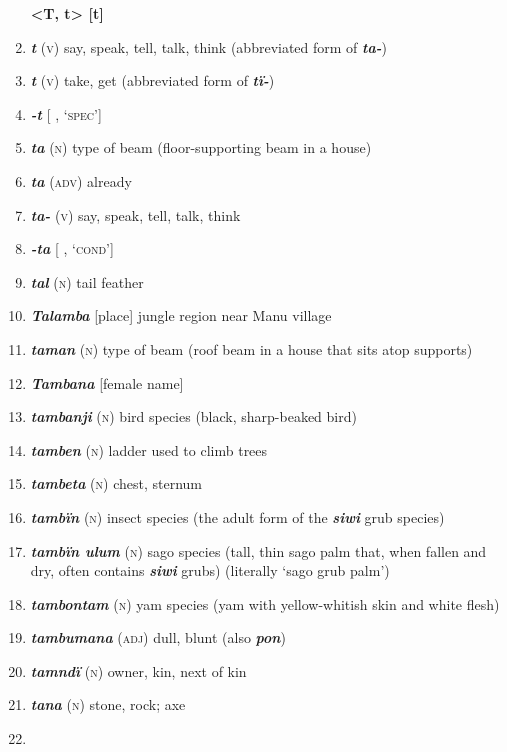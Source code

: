 \begin{enumerate}[noitemsep, label={}, align=left, widest=190, labelsep=1ex,leftmargin=*,itemindent=-10pt]
\noindent \textbf{<T, t>        [t]}\\ \item 

\textbf{\textit{t}} (\textsc{v}) say, speak, tell, talk, think (abbreviated form of \textbf{\textit{ta-}}) \item 
\textbf{\textit{t}} (\textsc{v}) take, get (abbreviated form of \textbf{\textit{tï-}}) \item 
\textbf{\textit{-t}} [ , ‘\textsc{spec}’] \item 
\textbf{\textit{ta}} (\textsc{n}) type of beam (floor-supporting beam in a house) \item 
\textbf{\textit{ta}} (\textsc{adv)} already \item 
\textbf{\textit{ta-}} (\textsc{v}) say, speak, tell, talk, think \item 
\textbf{\textit{-ta}} [ , ‘\textsc{cond}’] \item 
\textbf{\textit{tal}} (\textsc{n}) tail feather \item 
\textbf{\textit{Talamba}} [place] jungle region near Manu village \item 
\textbf{\textit{taman}} (\textsc{n}) type of beam (roof beam in a house that sits atop supports) \item 
\textbf{\textit{Tambana}} [female name] \item 
\textbf{\textit{tambanji}} (\textsc{n}) bird species (black, sharp-beaked bird) \item 
\textbf{\textit{tamben}} (\textsc{n}) ladder used to climb trees \item 
\textbf{\textit{tambeta}} (\textsc{n}) chest, sternum \item 
\textbf{\textit{tambïn}} (\textsc{n}) insect species (the adult form of the \textbf{\textit{siwi}} grub species) \item 
\textbf{\textit{tambïn ulum}} (\textsc{n}) sago species (tall, thin sago palm that, when fallen and dry, often contains \textbf{\textit{siwi}} grubs) (literally ‘sago grub palm’) \item 
\textbf{\textit{tambontam}} (\textsc{n}) yam species (yam with yellow-whitish skin and white flesh) \item 
\textbf{\textit{tambumana}} (\textsc{adj}) dull, blunt (also \textit{\textbf{pon}}) \item 
\textbf{\textit{tamndï}} (\textsc{n}) owner, kin, next of kin \item 
\textbf{\textit{tana}} (\textsc{n}) stone, rock; axe \item 

\end{enumerate}

